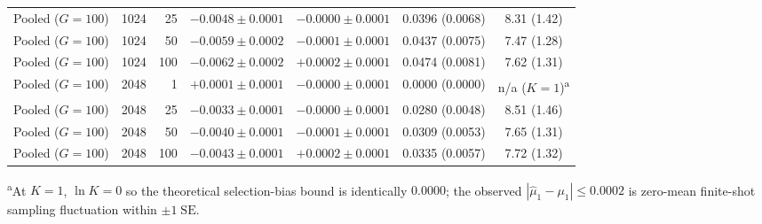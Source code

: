 \begin{table}[htbp]
\begin{tabular}{@{}l r r c c c c@{}}
Pooled ($G=100$) & 1024 & 25 & $-0.0048 \pm 0.0001$ & $-0.0000 \pm 0.0001$ & 0.0396 (0.0068) & 8.31 (1.42) \\
Pooled ($G=100$) & 1024 & 50 & $-0.0059 \pm 0.0002$ & $-0.0001 \pm 0.0001$ & 0.0437 (0.0075) & 7.47 (1.28) \\
Pooled ($G=100$) & 1024 & 100 & $-0.0062 \pm 0.0002$ & $+0.0002 \pm 0.0001$ & 0.0474 (0.0081) & 7.62 (1.31) \\
Pooled ($G=100$) & 2048 & 1 & $+0.0001 \pm 0.0001$ & $-0.0000 \pm 0.0001$ & 0.0000 (0.0000) & n/a ($K=1$)\textsuperscript{a} \\
Pooled ($G=100$) & 2048 & 25 & $-0.0033 \pm 0.0001$ & $-0.0000 \pm 0.0001$ & 0.0280 (0.0048) & 8.51 (1.46) \\
Pooled ($G=100$) & 2048 & 50 & $-0.0040 \pm 0.0001$ & $-0.0001 \pm 0.0001$ & 0.0309 (0.0053) & 7.65 (1.31) \\
Pooled ($G=100$) & 2048 & 100 & $-0.0043 \pm 0.0001$ & $+0.0002 \pm 0.0001$ & 0.0335 (0.0057) & 7.72 (1.32) \\
\bottomrule
\end{tabular}
\vspace{0.3em}
\par\noindent\footnotesize\textsuperscript{a}At $K=1$, $\ln K = 0$ so the theoretical selection-bias bound is identically $0.0000$; the observed $|\hat{\mu}_1 - \mu_1| \le 0.0002$ is zero-mean finite-shot sampling fluctuation within $\pm 1\;\mathrm{SE}$.
\end{table}
